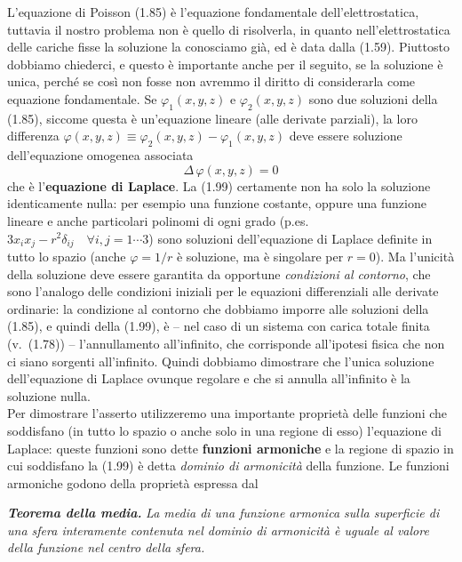 L'equazione di Poisson (1.85) \`e l'equazione fondamentale dell'elettrostatica,
tuttavia il nostro problema non \`e quello di risolverla, in quanto
nell'elettrostatica delle cariche fisse la soluzione la conosciamo gi\`a, ed \`e
data dalla (1.59). Piuttosto dobbiamo chiederci, e questo \`e importante anche
per il seguito, se la soluzione \`e unica, perch\'e se cos\`i non fosse non
avremmo il diritto di considerarla come equazione fondamentale. Se
$\varphi_1(x,y,z)$ e $\varphi_2(x,y,z)$ sono due soluzioni della (1.85), siccome
questa \`e un'equazione lineare (alle derivate parziali), la loro differenza
$\varphi(x,y,z)\equiv\varphi_2(x,y,z)-\varphi_1(x,y,z)$ deve essere soluzione
dell'equazione omogenea associata
\begin{equation}
  \Delta\,\varphi(x,y,z)=0
  \tag{1.99}
\end{equation}
che \`e l'\textbf{equazione di Laplace}. La (1.99) certamente non ha solo la
soluzione identicamente nulla: per esempio una funzione costante, oppure una
funzione lineare e anche particolari polinomi di ogni grado
(p.es.\ $3x_ix_j-r^2\delta_{ij}\quad\forall i,j=1\cdots3$) sono soluzioni
dell'equazione di Laplace definite in tutto lo spazio (anche $\varphi=1/r$ \`e
soluzione, ma \`e singolare per $r=0$). Ma l'unicit\`a della soluzione deve
essere garantita da opportune \emph{condizioni al contorno}, che sono l'analogo
delle condizioni iniziali per le equazioni differenziali alle derivate
ordinarie: la condizione al contorno che dobbiamo imporre alle soluzioni della
(1.85), e quindi della (1.99), \`e -- nel caso di un sistema con carica totale
finita \big(v.\ (1.78)\big) -- l'annullamento all'infinito, che corrisponde
all'ipotesi fisica che non ci siano sorgenti all'infinito. Quindi dobbiamo
dimostrare che l'unica soluzione dell'equazione di Laplace ovunque regolare e
che si annulla all'infinito \`e la soluzione nulla.\\
Per dimostrare l'asserto utilizzeremo una importante propriet\`a delle funzioni
che soddisfano (in tutto lo spazio o anche solo in una regione di esso)
l'equazione di Laplace: queste funzioni sono dette \textbf{funzioni armoniche} e
la regione di spazio in cui soddisfano la (1.99) \`e detta \emph{dominio di
armonicit\`a} della funzione. Le funzioni armoniche godono della propriet\`a
espressa dal

\textbf{\textit{Teorema della media.}} \textit{La media di una funzione armonica
sulla superficie di una sfera interamente contenuta nel dominio di armonicit\`a
\`e uguale al valore della funzione nel centro della sfera.}

